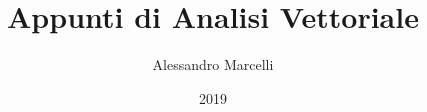 \documentclass[a4paper,12pt]{book}
\newcommand{\R}{\mathbb{R}}
\newcommand{\taleche}{\, : \,}
\begin{document}
\newcommand{\deffuncR}[2]{f \taleche A\subseteq \R^{#1} \longrightarrow \R^{#2} }
\newcommand{\deffuncRgen}[3]{#1 \taleche A\subseteq \R^{#2} \longrightarrow \R^{#3} }
\newcommand{\deffuncRn}{f \taleche A\subseteq \R^n \longrightarrow \R^n}

\author{Alessandro Marcelli}
\title{Appunti di Analisi Vettoriale}
\date{2019}


\frontmatter
\maketitle
\tableofcontents

\mainmatter





\backmatter
\end{document}

